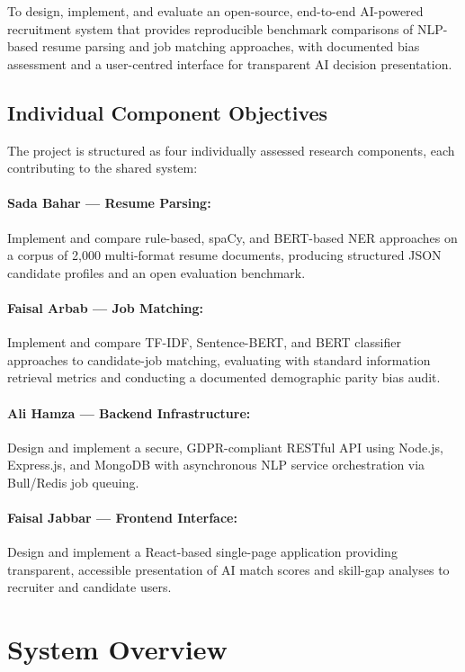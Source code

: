 To design, implement, and evaluate an open-source, end-to-end AI-powered recruitment system that provides reproducible benchmark comparisons of NLP-based resume parsing and job matching approaches, with documented bias assessment and a user-centred interface for transparent AI decision presentation.

\subsection{Individual Component Objectives}

The project is structured as four individually assessed research components, each contributing to the shared system:

\paragraph{Sada Bahar --- Resume Parsing:} Implement and compare rule-based, spaCy, and BERT-based NER approaches on a corpus of 2,000 multi-format resume documents, producing structured JSON candidate profiles and an open evaluation benchmark.

\paragraph{Faisal Arbab --- Job Matching:} Implement and compare TF-IDF, Sentence-BERT, and BERT classifier approaches to candidate-job matching, evaluating with standard information retrieval metrics and conducting a documented demographic parity bias audit.

\paragraph{Ali Hamza --- Backend Infrastructure:} Design and implement a secure, GDPR-compliant RESTful API using Node.js, Express.js, and MongoDB with asynchronous NLP service orchestration via Bull/Redis job queuing.

\paragraph{Faisal Jabbar --- Frontend Interface:} Design and implement a React-based single-page application providing transparent, accessible presentation of AI match scores and skill-gap analyses to recruiter and candidate users.

\section{System Overview}

